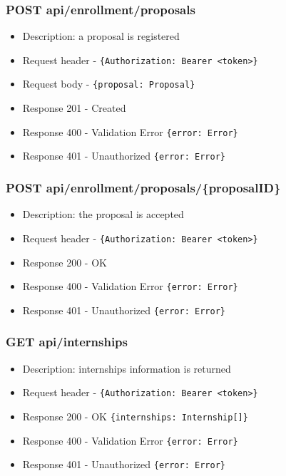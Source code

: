 \subsubsection{POST api/enrollment/proposals}
\begin{itemize}
    \item Description: a proposal is registered
    \item Request header - \verb|{Authorization: Bearer <token>}|
    \item Request body - \verb|{proposal: Proposal}|
    \item Response 201 - Created
    \item Response 400 - Validation Error \verb|{error: Error}|
    \item Response 401 - Unauthorized \verb|{error: Error}|
\end{itemize}

\subsubsection{POST api/enrollment/proposals/\{proposalID\}}
\begin{itemize}
    \item Description: the proposal is accepted
    \item Request header - \verb|{Authorization: Bearer <token>}|
    \item Response 200 - OK
    \item Response 400 - Validation Error \verb|{error: Error}|
    \item Response 401 - Unauthorized \verb|{error: Error}|
\end{itemize}

\subsubsection{GET api/internships}
\begin{itemize}
    \item Description: internships information is returned
    \item Request header - \verb|{Authorization: Bearer <token>}|
    \item Response 200 - OK \verb|{internships: Internship[]}|
    \item Response 400 - Validation Error \verb|{error: Error}|
    \item Response 401 - Unauthorized \verb|{error: Error}|
\end{itemize}

